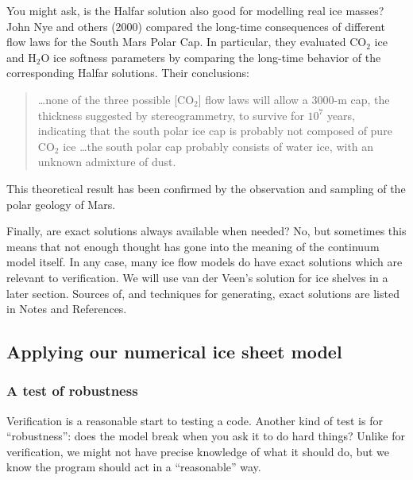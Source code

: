 \documentclass[titlepage,letterpaper,final,12pt]{scrartcl}
\begin{document}
You might ask, is the Halfar solution also good for modelling real ice masses?  John Nye and others (2000)
compared the long-time consequences of different flow laws for the South Mars Polar Cap.  In particular, they evaluated $\text{CO}_2$ ice and $\text{H}_2\text{O}$ ice softness parameters by comparing the long-time behavior of the corresponding Halfar solutions.  Their conclusions:
  \begin{quote}
  \dots none of the three possible [$\text{CO}_2$] flow laws will allow a 3000-m cap, the thickness suggested by stereogrammetry, to survive for $10^7$ years, indicating that the south polar ice cap is probably not composed of pure $\text{CO}_2$ ice \dots the south polar cap probably consists of water ice, with an unknown admixture of dust.
  \end{quote}
This theoretical result has been confirmed by the observation and sampling of the polar geology of Mars.

Finally, are exact solutions always available when needed?  No, but sometimes this means that not enough thought has gone into the meaning of the continuum model itself.  In any case, many ice flow models do have exact solutions which are relevant to verification.  We will use van der Veen's solution for ice shelves in a later section.  Sources of, and techniques for generating, exact solutions are listed in Notes and References.


\subsection{Applying our numerical ice sheet model}

\subsubsection*{A test of robustness}  Verification is a reasonable start to testing a code.  Another kind of test is for ``robustness'': does the model break when you ask it to do hard things?  Unlike for verification, we might not have precise knowledge of what it should do, but we know the program should act in a ``reasonable'' way.
\end{document}
